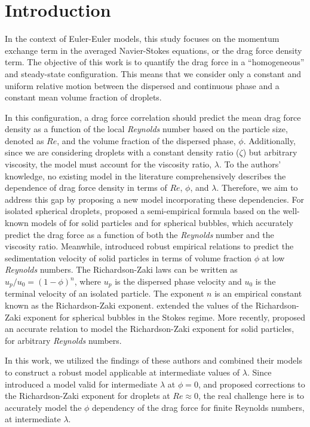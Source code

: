 \section{Introduction}

In the context of Euler-Euler models, this study focuses on the momentum exchange term in the averaged Navier-Stokes equations, or the drag force density term. 
The objective of this work is to quantify the drag force in a ``homogeneous'' and steady-state configuration.
This means that we consider only a constant and uniform relative motion between the dispersed and continuous phase and a constant mean volume fraction of droplets. 

In this configuration, a drag force correlation should predict the mean drag force density as a function of the local \textit{Reynolds} number based on the particle size, denoted as $Re$, and the volume fraction of the dispersed phase, $\phi$. Additionally, since we are considering droplets with a constant density ratio ($\zeta$) but arbitrary viscosity, the model must account for the viscosity ratio, $\lambda$. 
To the authors' knowledge, no existing model in the literature comprehensively describes the dependence of drag force density in terms of $Re$, $\phi$, and $\lambda$. 
Therefore, we aim to address this gap by proposing a new model incorporating these dependencies.
For isolated spherical droplets, \citet{magnaudet1997forces} proposed a semi-empirical formula based on the well-known models of \citet{schiller1933} for solid particles and \citet{mei1994} for spherical bubbles, which accurately predict the drag force as a function of both the \textit{Reynolds} number and the viscosity ratio.
Meanwhile, \citet{richardson1954} introduced robust empirical relations to predict the sedimentation velocity of solid particles in terms of volume fraction $\phi$ at low \textit{Reynolds} numbers. 
The Richardson-Zaki laws can be written as $u_p/u_0 = (1-\phi)^n$, where $u_p$ is the dispersed phase velocity and $u_0$ is the terminal velocity of an isolated particle. 
The exponent $n$ is an empirical constant known as the Richardson-Zaki exponent. 
\citet{ishii1979drag} extended the values of the Richardson-Zaki exponent for spherical bubbles in the Stokes regime. 
More recently, \citet{kramer2019improvement} proposed an accurate relation to model the Richardson-Zaki exponent for solid particles, for arbitrary \textit{Reynolds} numbers. 

In this work, we utilized the findings of these authors and combined their models to construct a robust model applicable at intermediate values of $\lambda$.
Since \citet{magnaudet1997forces} introduced a model valid for intermediate $\lambda$ at $\phi = 0$, and \citet{ishii1979drag} proposed corrections to the Richardson-Zaki exponent for droplets at $Re \approx 0$, the real challenge here is to accurately model the $\phi$ dependency of the drag force for finite Reynolds numbers, at intermediate $\lambda$.

